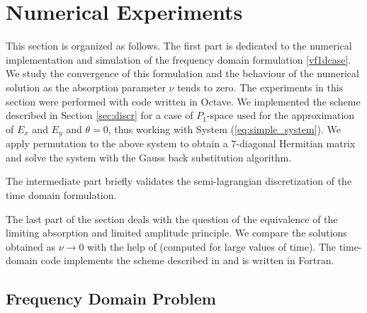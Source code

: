 
\section{Numerical Experiments}
This section is organized as follows. The first part is dedicated to the numerical implementation and simulation 
of the frequency domain formulation \eqref{vf1dcase}. We study the convergence of this formulation and the behaviour 
of the numerical solution as the absorption parameter $\nu$ tends to zero. The experiments in this section were 
performed with  code written in Octave.  
We implemented the scheme described in Section \ref{sec:discr} for a case of $P_{1}$-space used 
for the approximation of $E_{x}$ and $E_{y}$ and $\theta=0$, thus working with System (\ref{eq:simple_system}). 
We apply permutation to the above system 
to obtain a 7-diagonal Hermitian matrix and solve the system with the Gauss back substitution algorithm. 

The intermediate part briefly validates the semi-lagrangian discretization of the time domain formulation.

The last part of the section deals with the question of the equivalence of the limiting absorption and limited amplitude 
principle. We compare the solutions obtained as $\nu\rightarrow 0$ with the help of (computed for large values of time). 
The time-domain code implements the scheme described in  and 
is written in Fortran.
 
\subsection{Frequency Domain Problem}
\label{sec:freq_dep}

